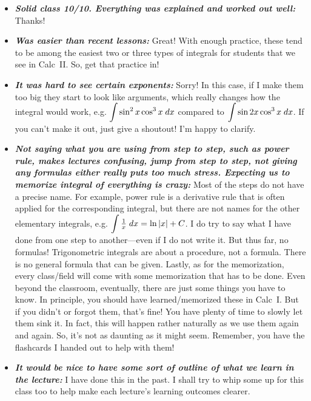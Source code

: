 \documentclass[11pt,letterpaper]{article}
\begin{document}
\begin{itemize}
\item {\bfseries\itshape Solid class 10/10. Everything was explained and worked out well:} Thanks!

\item {\bfseries\itshape Was easier than recent lessons:} Great! With enough practice, these tend to be among the easiest two or three types of integrals for students that we see in Calc~II. So, get that practice in!

\item {\bfseries\itshape It was hard to see certain exponents:} Sorry! In this case, if I make them too big they start to look like arguments, which really changes how the integral would work, e.g. $\displaystyle\int \sin^2 x \cos^3 x \;dx$ compared to $\displaystyle\int \sin 2x \cos^3 x \;dx$. If you can't make it out, just give a shoutout! I'm happy to clarify. 

\item {\bfseries\itshape Not saying what you are using from step to step, such as power rule, makes lectures confusing, jump from step to step, not giving any formulas either really puts too much stress. Expecting us to memorize integral of everything is crazy:} Most of the steps do not have a precise name. For example, power rule is a derivative rule that is often applied for the corresponding integral, but there are not names for the other elementary integrals, e.g. $\displaystyle\int \tfrac{1}{x} \;dx= \ln|x| + C$. I do try to say what I have done from one step to another---even if I do not write it. But thus far, no formulas! Trigonometric integrals are about a procedure, not a formula. There is no general formula that can be given. Lastly, as for the memorization, every class/field will come with some memorization that has to be done. Even beyond the classroom, eventually, there are just some things you have to know. In principle, you should have learned/memorized these in Calc~I. But if you didn't or forgot them, that's fine! You have plenty of time to slowly let them sink it. In fact, this will happen rather naturally as we use them again and again. So, it's not as daunting as it might seem. Remember, you have the flashcards I handed out to help with them!

\item {\bfseries\itshape It would be nice to have some sort of outline of what we learn in the lecture:} I have done this in the past. I shall try to whip some up for this class too to help make each lecture's learning outcomes clearer.
\end{itemize}
\end{document}
